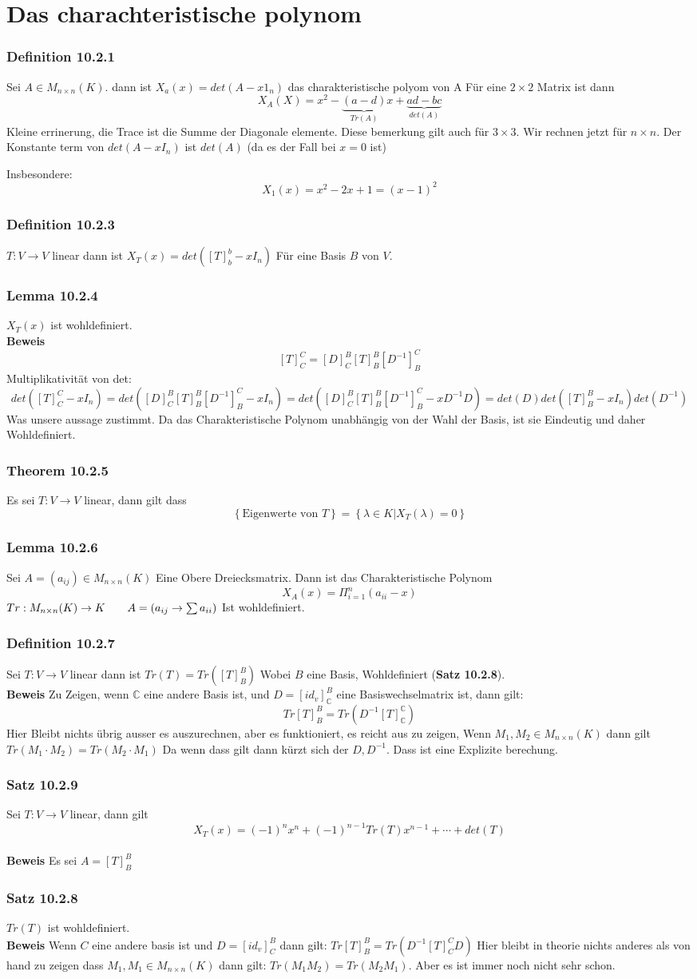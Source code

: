 \documentclass{article}
\newcommand{\mspc}{\hspace{0.7cm}}
\newcommand{\satz}[1]{\subsubsection*{Satz {#1}}}
\newcommand{\beweis}{\\\textbf{Beweis }}
\newcommand{\theorem}[1]{\subsubsection*{Theorem {#1}}}
\newcommand{\lemma}[1]{\subsubsection*{Lemma {#1}}}
\newcommand{\definition}[1]{\subsubsection*{Definition {#1}}}
\begin{document}
\section*{Das charachteristische polynom} \definition{10.2.1} Sei $A\in M_{n\times n}(K)$. dann ist $X_a(x)=det(A-x1_n)$ das charakteristische polyom von A
Für eine $2\times 2$ Matrix ist dann \[X_A(X)=x^2-\underset{Tr(A)}{\underbrace{(a-d)}}x+\underset{det(A)}{\underbrace{ad-bc}}\]
Kleine errinerung, die Trace ist die Summe der Diagonale elemente. Diese bemerkung gilt auch für $3\times3$. Wir rechnen jetzt für $n\times n$. Der Konstante term von $det(A-xI_n)$ ist $det(A)$ (da es der Fall bei $x=0$ ist)

Insbesondere:
\[X_1(x)=x^2-2x+1=(x-1)^2\]
\definition{10.2.3} $T:V\rightarrow V$ linear dann ist $X_T(x)=det([T]_b^b-xI_n)$ Für eine Basis $B$ von $V$.
\lemma{10.2.4} $X_T(x)$ ist wohldefiniert.
\beweis
\[[T]^C_C=[D]^B_C[T]^B_B[D^{-1}]^C_B\] 
Multiplikativität von det:
\[det([T]^C_C-xI_n)=det([D]^B_C[T]^B_B[D^{-1}]^C_B-xI_n)=det([D]^B_C[T]^B_B[D^{-1}]^C_B-xD^{-1}D)=det(D)det([T]^B_B-xI_n)det(D^{-1})\]
Was unsere  aussage zustimmt.
 Da  das  Charakteristische  Polynom unabhängig von der Wahl der Basis, ist sie Eindeutig und daher Wohldefiniert.
\theorem{10.2.5} Es sei $T:V\rightarrow V$ linear, dann gilt dass\[\left\lbrace\text{Eigenwerte von }T\right\rbrace=\left\lbrace\lambda\in K|X_T(\lambda)=0\right\rbrace\]
\lemma{10.2.6} Sei $A=(a_{ij})\in M_{n\times n}(K)$ Eine Obere Dreiecksmatrix. Dann ist das Charakteristische Polynom \[X_A(x)=\Pi_{i=1}^n(a_{ii}-x)\]
$Tr:M_{n\times n}(K)\rightarrow K\mspc A=(a_{ij}\rightarrow \sum a_{ii})$ Ist wohldefiniert.
\definition{10.2.7} Sei $T:V\rightarrow V$ linear  dann ist $Tr(T)=Tr([T]^B_B)$ Wobei $B$ eine Basis, Wohldefiniert (\textbf{Satz 10.2.8}).
\beweis Zu Zeigen, wenn $\mathbb{C}$ eine andere Basis ist, und  $D=[id_v]_\mathbb{C}^B$ eine Basiswechselmatrix ist, dann gilt: \[Tr[T]^B_B=Tr(D^{-1}[T]^\mathbb{C}_\mathbb{C})\] Hier Bleibt nichts übrig ausser es auszurechnen, aber es funktioniert, es
reicht aus  zu zeigen, Wenn $M_1,M_2\in M_{n\times n}(K)$ dann gilt $Tr(M_1\cdot M_2)=Tr(M_2\cdot M_1)$ Da wenn dass gilt dann kürzt sich der $D, D^{-1}$. Dass ist eine Explizite berechung.
\satz{10.2.9} Sei $T:V\rightarrow V$ linear, dann gilt \[X_T(x)=(-1)^nx^n +(-1)^{n-1}Tr(T)x^{n-1}+\cdots+det(T)\]
 \beweis Es sei $A=[T]^B_B$
\satz{10.2.8} $Tr(T)$ ist wohldefiniert.
\beweis Wenn $C$ eine andere basis ist und $D=\left[id_v\right]^B_C$ dann gilt: $Tr[T]^B_B=Tr(D^{-1}[T]^C_CD)$
 Hier bleibt in theorie nichts anderes als von hand zu zeigen dass $M_1,M_1\in M_{n\times n}(K)$ dann gilt: $Tr(M_1M_2)=Tr(M_2M_1)$. Aber es ist immer noch nicht sehr schon.
\end{document}

